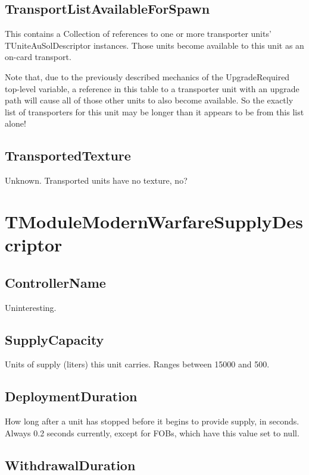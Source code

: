 \documentclass{article}
\begin{document}
\subsection{TransportListAvailableForSpawn}

This contains a Collection of references to one or more transporter units' TUniteAuSolDescriptor instances. Those units become available to this unit as an on-card transport.

Note that, due to the previously described mechanics of the UpgradeRequired top-level variable, a reference in this table to a transporter unit with an upgrade path will cause all of those other units to also become available. So the exactly list of transporters for this unit may be longer than it appears to be from this list alone!

\subsection{TransportedTexture}

Unknown. Transported units have no texture, no?

\section{TModuleModernWarfareSupplyDescriptor}

\subsection{ControllerName}

Uninteresting.

\subsection{SupplyCapacity}

Units of supply (liters) this unit carries. Ranges between 15000 and 500.

\subsection{DeploymentDuration}

How long after a unit has stopped before it begins to provide supply, in seconds. Always 0.2 seconds currently, except for FOBs, which have this value set to null.

\subsection{WithdrawalDuration}
\end{document}
